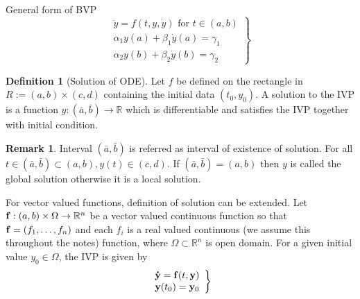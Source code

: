 \documentclass[12pt,reqno]{amsart}
\theoremstyle{plain}
\theoremstyle{definition}
\newtheorem{defn}{Definition}
\newtheorem{rem}{Remark}
\newcommand{\bb}[1]{\mathbb{#1}}
\begin{document}
General form of BVP
$$ 
\left.
\begin{array}{l}
    \ddot{y} = f(t, y, \dot{y}) \text{ for } t \in (a,b) \\
    \alpha_1y(a) + \beta_1 \dot{y}(a) = \gamma_1 \\
    \alpha_2 y(b) + \beta_2 \dot{y}(b) = \gamma_2     
\end{array}
\right\}
$$
\begin{defn}[Solution of ODE]
    Let $f$ be defined on the rectangle in $ R:= (a,b) \times (c,d)$ containing the initial data $(t_0, y_0)$. A solution to the IVP is a function $ y : (\bar{a}, \bar{b}) \to \bb{R}$ which is differentiable and satisfies the IVP together with initial condition.
\end{defn}
\begin{rem}
    Interval $(\bar{a}, \bar{b})$ is referred as interval of existence of solution. For all $ t \in (\bar{a}, \bar{b}) \subset (a,b), y(t) \in (c,d)$. If $(\bar{a},\bar{b}) = (a,b)$ then $y$ is called the global solution otherwise it is a local solution. 
\end{rem}
For vector valued functions, definition of solution can be extended.
Let ${\bf f}:(a,b) \times \Omega \to \bb{R}^n$ be a vector valued continuous function so that ${\bf f} = (f_1, \dots, f_n)$ and each $f_i$ is a real valued continuous (we assume this throughout the notes) function, where $\Omega \subset \bb{R}^n$ is open domain. For a given initial value $y_0 \in \Omega$, the IVP is given by 
$$
\left.
\begin{array}{l}
    {\bf \dot{y} = f}(t, {\bf y}) \\
    {\bf y}(t_0) = {\bf y}_0    
\end{array}
\right\}
$$
\end{document}
